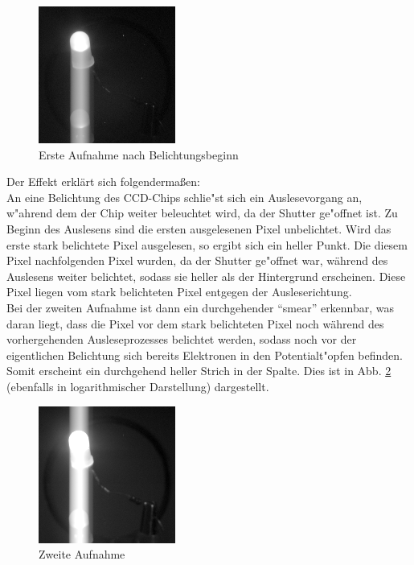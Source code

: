 \begin{figure}[h!]
\centering
        \includegraphics[width=.4\textwidth]{smear_unten_sebi2.png}
\caption{ Erste Aufnahme nach Belichtungsbeginn }
\label{fig:smear1}
\end{figure}
Der Effekt erklärt sich folgendermaßen:\\
An eine Belichtung des CCD-Chips schlie"st sich ein Auslesevorgang an, w"ahrend dem der Chip weiter beleuchtet wird, da der Shutter ge"offnet ist. Zu Beginn des Auslesens sind die ersten ausgelesenen Pixel unbelichtet. Wird das erste stark belichtete Pixel ausgelesen, so ergibt sich ein heller Punkt. Die diesem Pixel nachfolgenden Pixel wurden, da der Shutter ge"offnet war, während des Auslesens weiter belichtet, sodass sie heller als der Hintergrund erscheinen. Diese Pixel liegen vom stark belichteten Pixel entgegen der Ausleserichtung. \\
Bei der zweiten Aufnahme ist dann ein durchgehender \enquote{smear} erkennbar, was daran liegt, dass die Pixel vor dem stark belichteten Pixel noch während des vorhergehenden Ausleseprozesses belichtet werden, sodass noch vor der eigentlichen Belichtung sich bereits Elektronen in den Potentialt"opfen befinden. Somit erscheint ein durchgehend heller Strich in der Spalte. Dies ist in Abb. \ref{fig:smear2} (ebenfalls in logarithmischer Darstellung) dargestellt. 

\begin{figure}[h!]
\centering
        \includegraphics[width=.4\textwidth]{smear2.png}
\caption{ Zweite Aufnahme }
\label{fig:smear2}
\end{figure}

